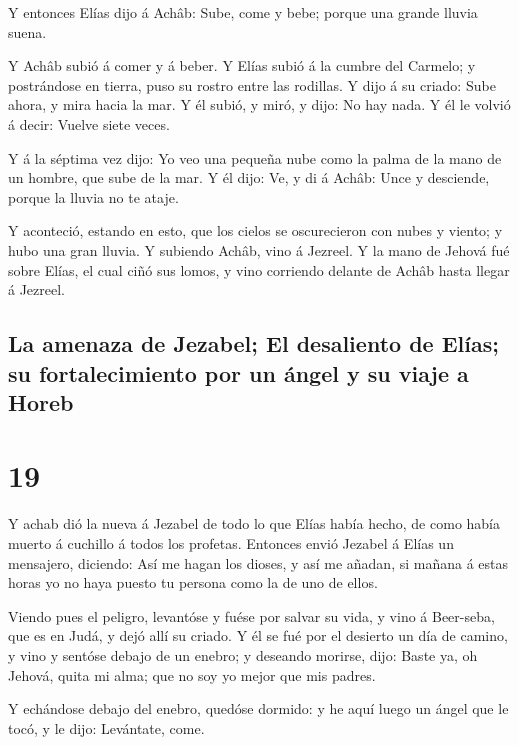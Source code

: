  Y entonces Elías dijo á Achâb: Sube, come y bebe; porque
una grande lluvia suena.

 Y Achâb subió á comer y á beber. Y Elías subió á la cumbre
del Carmelo; y postrándose en tierra, puso su rostro entre las rodillas.
 Y dijo á su criado: Sube ahora, y mira hacia la mar. Y él
subió, y miró, y dijo: No hay nada. Y él le volvió á decir: Vuelve siete
veces.

 Y á la séptima vez dijo: Yo veo una pequeña nube como la
palma de la mano de un hombre, que sube de la mar. Y él dijo: Ve, y di á
Achâb: Unce y desciende, porque la lluvia no te ataje.

 Y aconteció, estando en esto, que los cielos se
oscurecieron con nubes y viento; y hubo una gran lluvia. Y subiendo
Achâb, vino á Jezreel.  Y la mano de Jehová fué sobre
Elías, el cual ciñó sus lomos, y vino corriendo delante de Achâb hasta
llegar á Jezreel.

\hypertarget{la-amenaza-de-jezabel-el-desaliento-de-eluxedas-su-fortalecimiento-por-un-uxe1ngel-y-su-viaje-a-horeb}{%
\subsection{La amenaza de Jezabel; El desaliento de Elías; su
fortalecimiento por un ángel y su viaje a
Horeb}\label{la-amenaza-de-jezabel-el-desaliento-de-eluxedas-su-fortalecimiento-por-un-uxe1ngel-y-su-viaje-a-horeb}}

\hypertarget{section-18}{%
\section{19}\label{section-18}}

 Y achab dió la nueva á Jezabel de todo lo que Elías había
hecho, de como había muerto á cuchillo á todos los profetas.
 Entonces envió Jezabel á Elías un mensajero, diciendo: Así
me hagan los dioses, y así me añadan, si mañana á estas horas yo no haya
puesto tu persona como la de uno de ellos.

 Viendo pues el peligro, levantóse y fuése por salvar su
vida, y vino á Beer-seba, que es en Judá, y dejó allí su criado.
 Y él se fué por el desierto un día de camino, y vino y
sentóse debajo de un enebro; y deseando morirse, dijo: Baste ya, oh
Jehová, quita mi alma; que no soy yo mejor que mis padres.

 Y echándose debajo del enebro, quedóse dormido: y he aquí
luego un ángel que le tocó, y le dijo: Levántate, come.

